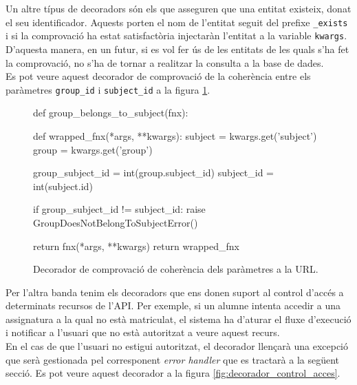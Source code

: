 Un altre típus de decoradors són els que asseguren que una entitat existeix, donat el seu identificador. Aquests porten el nom de l'entitat seguit del prefixe \texttt{\_exists} i si la comprovació ha estat satisfactòria injectaràn l'entitat a la variable \texttt{kwargs}. D'aquesta manera, en un futur, si es vol fer ús de les entitats de les quals s'ha fet la comprovació, no s'ha de tornar a realitzar la consulta a la base de dades.\\

Es pot veure aquest decorador de comprovació de la coherència entre els paràmetres \texttt{group\_id} i \texttt{subject\_id} a la figura \ref{fig:decorador_coherencia}.\\

\begin{figure}[h!]
	\begin{python}
def group_belongs_to_subject(fnx):

	def wrapped_fnx(*args, **kwargs):
		subject = kwargs.get('subject')
		group = kwargs.get('group')
		
		group_subject_id = int(group.subject_id)
		subject_id = int(subject.id)
		
		if group_subject_id != subject_id:
			raise GroupDoesNotBelongToSubjectError()
		
		return fnx(*args, **kwargs)
	return wrapped_fnx
	\end{python}
	\caption{Decorador de comprovació de coherència dels paràmetres a la \ac{URL}.}
	\label{fig:decorador_coherencia}
\end{figure}

Per l'altra banda tenim els decoradors que ens donen suport al control d'accés a determinats recursos de l'\ac{API}. Per exemple, si un alumne intenta accedir a una assignatura a la qual no està matriculat, el sistema ha d'aturar el fluxe d'execució i notificar a l'usuari que no està autoritzat a veure aquest recurs. \\

En el cas de que l'usuari no estigui autoritzat, el decorador llençarà una excepció que serà gestionada pel corresponent \emph{error handler} que es tractarà a la següent secció. Es pot veure aquest decorador a la figura \ref{fig:decorador_control_acces}.\\

